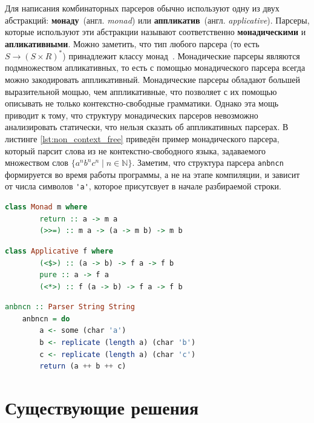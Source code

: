 \documentclass[times]{itmo-student-thesis}
\begin{document}
Для написания комбинаторных парсеров обычно используют одну из двух абстракций: \textbf{монаду}~(англ.
\textit{monad})	или \textbf{аппликатив}~(англ. \textit{applicative}). Парсеры, которые используют эти
абстракции называют соответственно  \textbf{монадическими} и \textbf{апликативными}. Можно заметить, что тип любого
парсера (то есть $S \rightarrow (S \times R)^*$) принадлежит классу монад~\cite{hutton_monadic_1999}. Монадические парсеры
являются подмножеством апликативных, то есть с помощью монадического парсера всегда можно закодировать аппликативный.
Монадические парсеры обладают большей выразительной мощью, чем аппликативные, что позволяет с их помощью описывать не
только	    контекстно-свободные грамматики. Однако эта мощь приводит к тому, что структуру монадических парсеров
невозможно анализировать статически, что нельзя сказать об аппликативных парсерах. В листинге \ref{lst:non_context_free}
приведён пример монадического парсера,	который парсит слова из не контекстно-свободного языка, задаваемого множеством
слов $\{a^nb^nc^n \mid n \in \mathbb{N}\}$. Заметим, что структура парсера \lstinline{anbncn} формируется во время работы
программы, а не на этапе компиляции, и зависит от числа символов \lstinline{'a'}, которое присутсвует в
начале разбираемой строки.

\begin{lstlisting}[language=Haskell,float=!h,caption={Класс монад в Haskell},label={lst:monad_typeclass}]
    class Monad m where
        return :: a -> m a
        (>>=) :: m a -> (a -> m b) -> m b
\end{lstlisting}

\begin{lstlisting}[language=Haskell,caption={Класс аппликативов в Haskell},label={lst:applicative_typeclass}]
    class Applicative f where
        (<$>) :: (a -> b) -> f a -> f b
        pure :: a -> f a
        (<*>) :: f (a -> b) -> f a -> f b
\end{lstlisting}

\begin{lstlisting}[language=Haskell,caption={Монадический парсер для не КС языка},label={lst:non_context_free}]
    anbncn :: Parser String String
    anbncn = do
        a <- some (char 'a')
        b <- replicate (length a) (char 'b')
        c <- replicate (length a) (char 'c')
        return (a ++ b ++ c)
\end{lstlisting}

\section{Существующие решения}\label{sec:existing_solutions}
\end{document}

